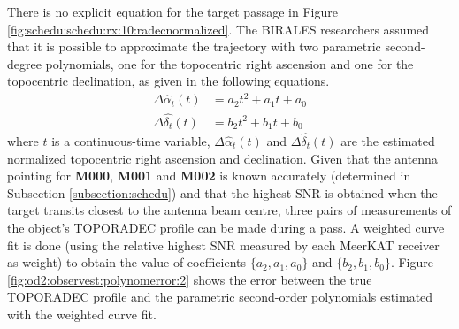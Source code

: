 \documentclass[conference]{IEEEtran}
\begin{document}
There is no explicit equation for the target passage in Figure \ref{fig:schedu:schedu:rx:10:radecnormalized}. The BIRALES researchers assumed that it is possible to approximate the trajectory with two parametric second-degree polynomials, one for the topocentric right ascension and one for the topocentric declination, as given in the following equations.
\begin{align}
\Delta \hat{\alpha}_t(t) &=  a_2 t^2 + a_1 t + a_0\\
\Delta \hat{\delta_t}(t) &=  b_2 t^2 + b_1 t + b_0
\label{eqn:od2:observest:toporadec}
\end{align}
where $t$ is a continuous-time variable, $\Delta \hat{\alpha}_t(t)$ and $\Delta \hat{\delta_t}(t)$ are the estimated normalized topocentric right ascension and declination. Given that the antenna pointing for \textbf{M000}, \textbf{M001} and \textbf{M002} is known accurately (determined in Subsection \ref{subsection:schedu}) and that the highest SNR is obtained when the target transits closest to the antenna beam centre, three pairs of measurements of the object's TOPORADEC profile can be made during a pass. A weighted curve fit is done (using the relative highest SNR measured by each MeerKAT receiver as weight) to obtain the value of coefficients $\{a_2,a_1,a_0\}$ and $\{b_2,b_1,b_0\}$. Figure \ref{fig:od2:observest:polynomerror:2} shows the error between the true TOPORADEC profile and the parametric second-order polynomials estimated with the weighted curve fit.
\end{document}
